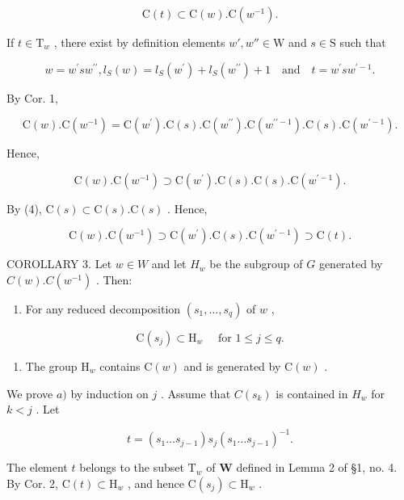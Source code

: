 \[
\mathrm{C} (t) \subset \mathrm{C} (w). \mathrm{C} (w ^ {- 1}).
\]

If \(t \in \mathrm{T}_w\) , there exist by definition elements \(w', w'' \in \mathrm{W}\) and \(s \in \mathrm{S}\) such that

\[
w = w ^ {\prime} s w ^ {\prime \prime}, l _ {S} (w) = l _ {S} (w ^ {\prime}) + l _ {S} (w ^ {\prime \prime}) + 1 \quad \text {and} \quad t = w ^ {\prime} s w ^ {\prime - 1}.
\]

By Cor. 1,

\[
\mathrm{C} (w). \mathrm{C} (w ^ {- 1}) = \mathrm{C} (w ^ {\prime}). \mathrm{C} (s). \mathrm{C} (w ^ {\prime \prime}). \mathrm{C} (w ^ {\prime \prime - 1}). \mathrm{C} (s). \mathrm{C} (w ^ {\prime - 1}).
\]

Hence,

\[
\mathrm{C} (w). \mathrm{C} (w ^ {- 1}) \supset \mathrm{C} (w ^ {\prime}). \mathrm{C} (s). \mathrm{C} (s). \mathrm{C} (w ^ {\prime - 1}).
\]

By (4), \(\mathrm{C}(s) \subset \mathrm{C}(s). \mathrm{C}(s)\) . Hence,

\[
\mathrm{C} (w). \mathrm{C} (w ^ {- 1}) \supset \mathrm{C} (w ^ {\prime}). \mathrm{C} (s). \mathrm{C} (w ^ {\prime - 1}) \supset \mathrm{C} (t).
\]

COROLLARY 3. Let \(w \in W\) and let \(H_w\) be the subgroup of \(G\) generated by \(C(w).C(w^{-1})\) . Then:

\begin{enumerate}
\def\labelenumi{\alph{enumi})}
\tightlist
\item
  For any reduced decomposition \((s_1,\ldots ,s_q)\) of \(w\) ,
\end{enumerate}

\[
\mathrm{C} (s _ {j}) \subset \mathrm{H} _ {w} \quad \text { for } 1 \leqslant j \leqslant q.
\]

\begin{enumerate}
\def\labelenumi{\alph{enumi})}
\setcounter{enumi}{1}
\tightlist
\item
  The group \(\mathrm{H}_w\) contains \(\mathrm{C}(w)\) and is generated by \(\mathrm{C}(w)\) .
\end{enumerate}

We prove \(a)\) by induction on \(j\) . Assume that \(C(s_k)\) is contained in \(H_w\) for \(k < j\) . Let

\[
t = (s _ {1} \dots s _ {j - 1}) s _ {j} (s _ {1} \dots s _ {j - 1}) ^ {- 1}.
\]

The element \(t\) belongs to the subset \(\mathrm{T}_w\) of \(\mathbf{W}\) defined in Lemma 2 of §1, no. 4. By Cor. 2, \(\mathrm{C}(t) \subset \mathrm{H}_w\) , and hence \(\mathrm{C}(s_j) \subset \mathrm{H}_w\) .

